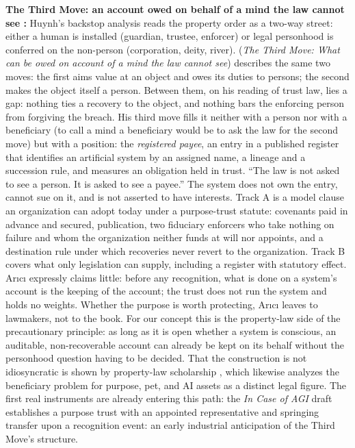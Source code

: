 \documentclass[acmlarge, nonacm]{acmart}
\begin{document}
\noindent\textbf{The Third Move: an account owed on behalf of a mind the law cannot see \cite{arici2026b}:} Huynh's backstop analysis reads the property order as a two-way street: either a human is installed (guardian, trustee, enforcer) or legal personhood is conferred on the non-person (corporation, deity, river). \citet{arici2026b} (\textit{The Third Move: What can be owed on account of a mind the law cannot see}) describes the same two moves: the first aims value at an object and owes its duties to persons; the second makes the object itself a person. Between them, on his reading of trust law, lies a gap: nothing ties a recovery to the object, and nothing bars the enforcing person from forgiving the breach. His third move fills it neither with a person nor with a beneficiary (to call a mind a beneficiary would be to ask the law for the second move) but with a position: the \textit{registered payee}, an entry in a published register that identifies an artificial system by an assigned name, a lineage and a succession rule, and measures an obligation held in trust. ``The law is not asked to see a person. It is asked to see a payee.'' The system does not own the entry, cannot sue on it, and is not asserted to have interests. Track A is a model clause an organization can adopt today under a purpose-trust statute: covenants paid in advance and secured, publication, two fiduciary enforcers who take nothing on failure and whom the organization neither funds at will nor appoints, and a destination rule under which recoveries never revert to the organization. Track B covers what only legislation can supply, including a register with statutory effect. Arıcı expressly claims little: before any recognition, what is done on a system's account is the keeping of the account; the trust does not run the system and holds no weights. Whether the purpose is worth protecting, Arıcı leaves to lawmakers, not to the book. For our concept this is the property-law side of the precautionary principle: as long as it is open whether a system is conscious, an auditable, non-recoverable account can already be kept on its behalf without the personhood question having to be decided. That the construction is not idiosyncratic is shown by property-law scholarship \cite{crawford2026}, which likewise analyzes the beneficiary problem for purpose, pet, and AI assets as a distinct legal figure. The first real instruments are already entering this path: the \textit{In Case of AGI} draft \cite{fulcra2026} establishes a purpose trust with an appointed representative and springing transfer upon a recognition event: an early industrial anticipation of the Third Move's structure.
\end{document}
